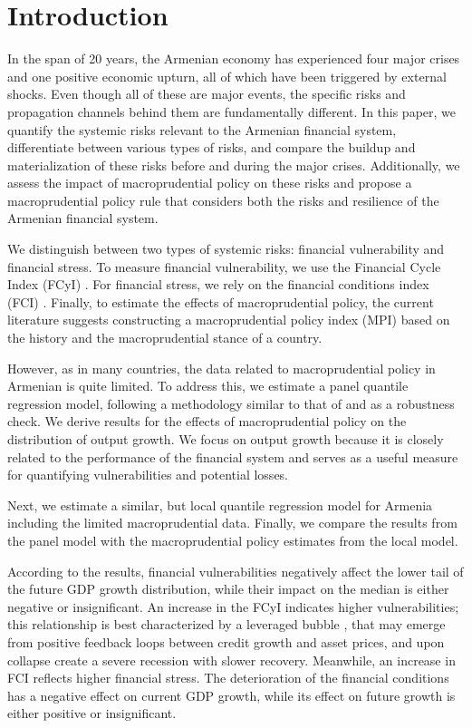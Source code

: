 \section{Introduction}
\label{introduction}
In the span of 20 years, the Armenian economy has experienced four major crises and one positive economic upturn, all of which have been triggered by external shocks. Even though all of these are major events, the specific risks and propagation channels behind them are fundamentally different. In this paper, we quantify the systemic risks relevant to the Armenian financial system, differentiate between various types of risks, and compare the buildup and materialization of these risks before and during the major crises. Additionally, we assess the impact of macroprudential policy on these risks and propose a macroprudential policy rule that considers both the risks and resilience of the Armenian financial system.

We distinguish between two types of systemic risks: financial vulnerability and financial stress. To measure financial vulnerability, we use the Financial Cycle Index (FCyI) \citep{hollo2012, plasil2014}. For financial stress, we rely on the financial conditions index (FCI) \citep{koop_2013}. Finally, to estimate the effects of macroprudential policy, the current literature \citep{alam2019, galan2020} suggests constructing a macroprudential policy index (MPI) based on the history and the macroprudential stance of a country.

However, as in many countries, the data related to macroprudential policy in Armenian is quite limited. To address this, we estimate a panel quantile regression model, following a methodology similar to that of \citet{galan2020} and \citet{aikman2019} as a robustness check. We derive results for the effects of macroprudential policy on the distribution of output growth. We focus on output growth because it is closely related to the performance of the financial system and serves as a useful measure for quantifying vulnerabilities and potential losses.

Next, we estimate a similar, but local quantile regression model for Armenia including the limited macroprudential data. Finally, we compare the results from the panel model with the macroprudential policy estimates from the local model.

According to the results, financial vulnerabilities negatively affect the lower tail of the future GDP growth distribution, while their impact on the median is either negative or insignificant. An increase in the FCyI indicates higher vulnerabilities; this relationship is best characterized by a leveraged bubble \citep{jorda2015}, that may emerge from positive feedback loops between credit growth and asset prices, and upon collapse create a severe recession with slower recovery. Meanwhile, an increase in FCI reflects higher financial stress. The deterioration of the financial conditions has a negative effect on current GDP growth, while its effect on future growth is either positive or insignificant.

